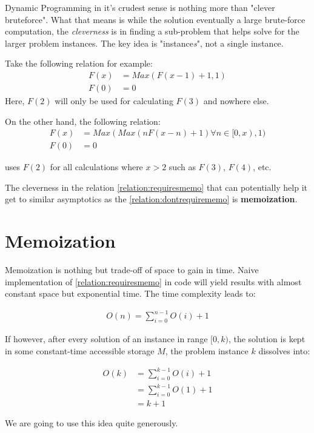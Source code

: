 Dynamic Programming in it's crudest sense is nothing more than "clever bruteforce".
What that means is while the solution eventually a large brute-force computation, the \emph{cleverness} is in finding a sub-problem that helps solve for the larger problem instances. The key idea is "instance\emph{s}", not a single instance.

Take the following relation for example:
\begin{equation}
    \label{relation:dontrequirememo}
    \begin{split}
        F(x) &= Max(F(x-1) + 1, 1) \\
        F(0) &= 0
    \end{split}
\end{equation}
Here, $F(2)$ will only be used for calculating $F(3)$ and nowhere else. 

On the other hand, the following relation:
\begin{equation}
    \label{relation:requiresmemo}
    \begin{split}
        F(x) &= Max(Max(n F(x-n) + 1) \forall n \in [0, x), 1) \\
        F(0) &= 0
    \end{split}
\end{equation}

uses $F(2)$ for all calculations where $x > 2$ such as $F(3)$, $F(4)$, etc.

The cleverness in the relation \ref{relation:requiresmemo} that can potentially help it get to similar asymptotics as the \ref{relation:dontrequirememo} is \textbf{memoization}.

\section{Memoization}
Memoization is nothing but trade-off of space to gain in time. Naive implementation of \ref{relation:requiresmemo} in code will yield results with almost constant space but exponential time. The time complexity leads to:

\begin{equation}
    \label{timecomplexity:requiresmemo}
    \begin{split}
        O(n) = \sum_{i = 0}^{n-1}O(i) + 1
    \end{split}
\end{equation}

If however, after every solution of an instance in range $[0, k)$, the solution is kept in some constant-time accessible storage $M$, the problem instance $k$ dissolves into:

\begin{equation}
    \label{timecomplexity:requiresmemowithmemo}
    \begin{split}
        O(k) &= \sum_{i = 0}^{k-1}O(i) + 1 \\
            &= \sum_{i = 0}^{k-1}O(1) + 1 \\
            &= k+1
    \end{split}
\end{equation}

We are going to use this idea quite generously.